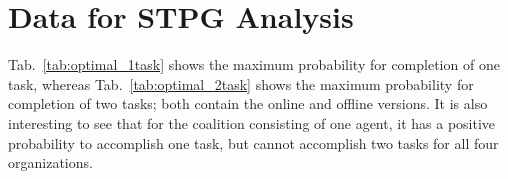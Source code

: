 \documentclass{llncs}
\begin{document}
\section{Data for STPG Analysis}
\label{app:coalitions_data}

Tab.~\ref{tab:optimal_1task} shows the maximum probability for completion of one task, whereas Tab.~\ref{tab:optimal_2task} shows the maximum probability for completion of two tasks; both contain the online and offline versions. It is also interesting to see that for the coalition consisting of one agent, it has a positive probability to accomplish one task, but cannot accomplish two tasks for all four organizations.




\begin{table}
 \centering
{}
\caption{Values for maximum probabilities to complete one task for coalitions from Tab.~\ref{tab:optimal_coalitions}.} \label{tab:optimal_1task}
\end{table}
\end{document}
